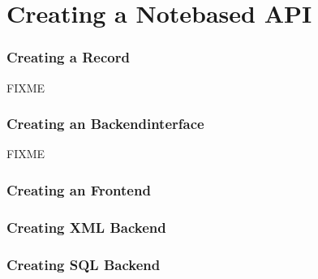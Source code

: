 \section{Creating a Notebased API}

\subsubsection{Creating a Record}
FIXME

\subsubsection{Creating an Backendinterface}
FIXME


\subsubsection{Creating an Frontend}


\subsubsection{Creating XML Backend}

\subsubsection{Creating SQL Backend}
